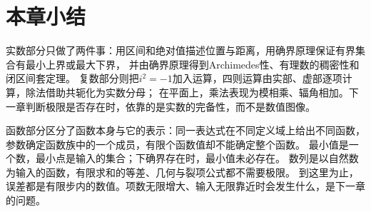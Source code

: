 \FloatBarrier
\section{本章小结}
\label{sec:real-complex-functions-summary}

实数部分只做了两件事：用区间和绝对值描述位置与距离，用确界原理保证有界集合有最小上界或最大下界，
并由确界原理得到Archimedes性、有理数的稠密性和闭区间套定理。
复数部分则把$i^2=-1$加入运算，四则运算由实部、虚部逐项计算，除法借助共轭化为实数分母；
在平面上，乘法表现为模相乘、辐角相加。下一章判断极限是否存在时，依靠的是实数的完备性，而不是数值图像。

函数部分区分了函数本身与它的表示：同一表达式在不同定义域上给出不同函数，参数确定函数族中的一个成员，有限个函数值却不能确定整个函数。
最小值是一个数，最小点是输入的集合；下确界存在时，最小值未必存在。
数列是以自然数为输入的函数，有限求和的等差、几何与裂项公式都不需要极限。
到这里为止，误差都是有限步内的数值。项数无限增大、输入无限靠近时会发生什么，是下一章的问题。
